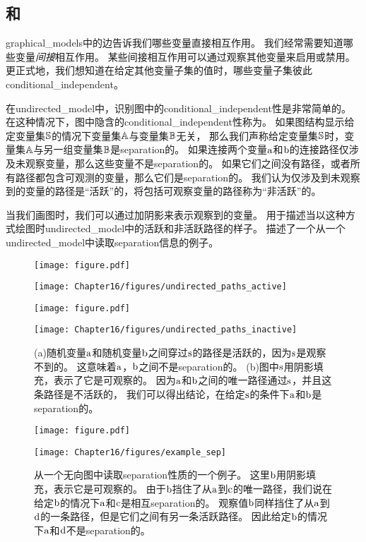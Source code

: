 \subsection{和}
\label{sec:separation_and_d_separation}

\gls{graphical_models}中的边告诉我们哪些变量直接相互作用。
我们经常需要知道哪些变量\emph{间接}相互作用。 
某些间接相互作用可以通过观察其他变量来启用或禁用。
更正式地，我们想知道在给定其他变量子集的值时，哪些变量子集彼此\gls{conditional_independent}。


在\gls{undirected_model}中，识别图中的\gls{conditional_independent}性是非常简单的。 
在这种情况下，图中隐含的\gls{conditional_independent}性称为。
如果图结构显示给定变量集$\mathbb{S}$的情况下变量集$\mathbb{A}$与变量集$\mathbb{B}$无关，
那么我们声称给定变量集$\mathbb{S}$时，变量集$\mathbb{A}$与另一组变量集$\mathbb{B}$是\gls{separation}的。
如果连接两个变量$\mathrm{a}$和$\mathrm{b}$的连接路径仅涉及未观察变量，那么这些变量不是\gls{separation}的。
如果它们之间没有路径，或者所有路径都包含可观测的变量，那么它们是\gls{separation}的。
我们认为仅涉及到未观察到的变量的路径是``活跃''的，将包括可观察变量的路径称为``非活跃''的。


当我们画图时，我们可以通过加阴影来表示观察到的变量。
用于描述当以这种方式绘图时\gls{undirected_model}中的活跃和非活跃路径的样子。
描述了一个从一个\gls{undirected_model}中读取\gls{separation}信息的例子。


\begin{figure}[!htb]
\ifOpenSource
\centerline{\texttt{[image: figure.pdf]}}
\else
	\centerline{\texttt{[image: Chapter16/figures/undirected\_paths\_active]}}
\fi
\ifOpenSource
\centerline{\texttt{[image: figure.pdf]}}
\else
	\centerline{\texttt{[image: Chapter16/figures/undirected\_paths\_inactive]}}	
\fi
\caption{(a)随机变量$\mathrm{a}$和随机变量$\mathrm{b}$之间穿过$\mathrm{s}$的路径是活跃的，因为$\mathrm{s}$是观察不到的。
这意味着$\mathrm{a}$，$\mathrm{b}$之间不是\gls{separation}的。
 (b)图中$\mathrm{s}$用阴影填充，表示了它是可观察的。
因为$\mathrm{a}$和$\mathrm{b}$之间的唯一路径通过$\mathrm{s}$，并且这条路径是不活跃的，
我们可以得出结论，在给定$\mathrm{s}$的条件下$\mathrm{a}$和$\mathrm{b}$是\gls{separation}的。}
\label{fig:undirected_paths_active}
\end{figure}

\begin{figure}[!htb]
\ifOpenSource
\centerline{\texttt{[image: figure.pdf]}}
\else
	\centerline{\texttt{[image: Chapter16/figures/example\_sep]}}
\fi
\caption{从一个无向图中读取\gls{separation}性质的一个例子。
这里$\mathrm{b}$用阴影填充，表示它是可观察的。
由于$\mathrm{b}$挡住了从$\mathrm{a}$到$\mathrm{c}$的唯一路径，我们说在给定$\mathrm{b}$的情况下$\mathrm{a}$和$\mathrm{c}$是相互\gls{separation}的。
观察值$\mathrm{b}$同样挡住了从$\mathrm{a}$到$\mathrm{d}$的一条路径，但是它们之间有另一条活跃路径。
因此给定$\mathrm{b}$的情况下$\mathrm{a}$和$\mathrm{d}$不是\gls{separation}的。}
	\label{fig:example_sep}
\end{figure}



